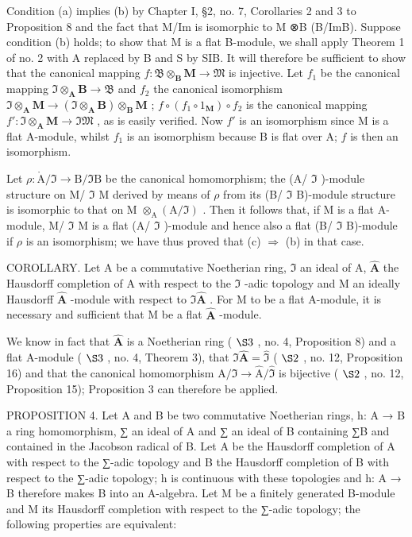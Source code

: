 Condition (a) implies (b) by Chapter I, §2, no. 7, Corollaries 2 and 3 to Proposition 8 and the fact that M/Im is isomorphic to M ⊗B (B/ImB). Suppose condition (b) holds; to show that M is a flat B-module, we shall apply Theorem 1 of no. 2 with A replaced by B and S by SIB. It will therefore be sufficient to show that the canonical mapping \(f\colon \mathfrak{B} \otimes_{\mathbf{B}} \mathbf{M} \to \mathfrak{M}\) is injective. Let \(f_1\) be the canonical mapping \(\mathfrak{I} \otimes_{\mathbf{A}} \mathbf{B} \to \mathfrak{B}\) and \(f_2\) the canonical isomorphism \(\mathfrak{I} \otimes_{\mathbf{A}} \mathbf{M} \to (\mathfrak{I} \otimes_{\mathbf{A}} \mathbf{B}) \otimes_{\mathbf{B}} \mathbf{M}\) ; \(f \circ (f_1 \circ 1_{\mathbf{M}}) \circ f_2\) is the canonical mapping \(f'\colon \mathfrak{I} \otimes_{\mathbf{A}} \mathbf{M} \to \mathfrak{IM}\) , as is easily verified. Now \(f'\) is an isomorphism since M is a flat A-module, whilst \(f_1\) is an isomorphism because B is flat over A; \(f\) is then an isomorphism.

Let \(\rho: \mathring{\mathrm{A}}/\mathfrak{I} \to \mathrm{B}/\mathfrak{I}\mathrm{B}\) be the canonical homomorphism; the (A/ \(\mathfrak{I}\) )-module structure on M/ \(\mathfrak{I}\) M derived by means of \(\rho\) from its (B/ \(\mathfrak{I}\) B)-module structure is isomorphic to that on M \(\otimes_{\mathrm{A}} (\mathrm{A}/\mathfrak{I})\) . Then it follows that, if M is a flat A-module, M/ \(\mathfrak{I}\) M is a flat (A/ \(\mathfrak{I}\) )-module and hence also a flat (B/ \(\mathfrak{I}\) B)-module if \(\rho\) is an isomorphism; we have thus proved that (c) \(\Rightarrow\) (b) in that case.

COROLLARY. Let A be a commutative Noetherian ring, \(\Im\) an ideal of A, \(\hat{\mathbf{A}}\) the Hausdorff completion of A with respect to the \(\Im\) -adic topology and M an ideally Hausdorff \(\hat{\mathbf{A}}\) -module with respect to \(\Im\hat{\mathbf{A}}\) . For M to be a flat A-module, it is necessary and sufficient that M be a flat \(\hat{\mathbf{A}}\) -module.

We know in fact that \(\hat{\mathbf{A}}\) is a Noetherian ring ( \(\S 3\) , no. 4, Proposition 8) and a flat A-module ( \(\S 3\) , no. 4, Theorem 3), that \(\Im \hat{\mathbf{A}} = \hat{\mathfrak{I}}\) ( \(\S 2\) , no. 12, Proposition 16) and that the canonical homomorphism \(\mathrm{A} / \Im \to \hat{\mathrm{A}} / \hat{\mathfrak{I}}\) is bijective ( \(\S 2\) , no. 12, Proposition 15); Proposition 3 can therefore be applied.

PROPOSITION 4. Let A and B be two commutative Noetherian rings, h: A → B a ring homomorphism, ∑ an ideal of A and ∑ an ideal of B containing ∑B and contained in the Jacobson radical of B. Let A be the Hausdorff completion of A with respect to the ∑-adic topology and B the Hausdorff completion of B with respect to the ∑-adic topology; h is continuous with these topologies and h: A → B therefore makes B into an A-algebra. Let M be a finitely generated B-module and M its Hausdorff completion with respect to the ∑-adic topology; the following properties are equivalent:

